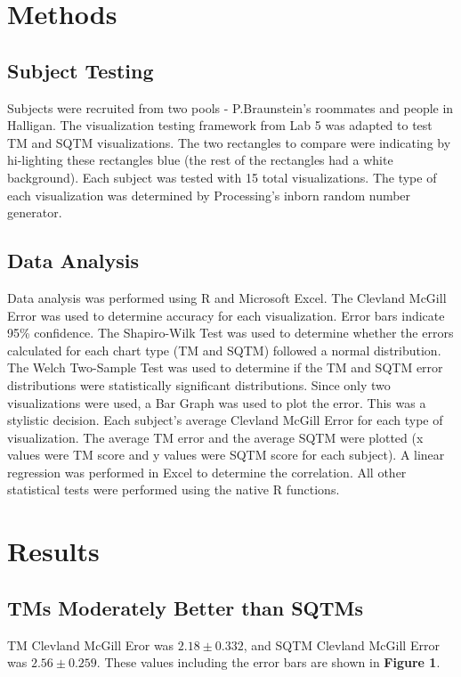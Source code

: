 \documentclass{article}
\begin{document}
\section*{Methods}
\subsection*{Subject Testing}
Subjects were recruited from two pools - P.Braunstein's roommates and people in Halligan. The visualization testing
framework from Lab 5 was adapted to test TM and SQTM visualizations. The two rectangles to compare were indicating
by hi-lighting these rectangles blue (the rest of the rectangles had a white background). Each subject was tested with 15 total visualizations. The type of each visualization was determined by Processing's inborn random number generator.  

\subsection*{Data Analysis}
Data analysis was performed using R and Microsoft Excel. The Clevland McGill Error was used to determine accuracy for each visualization. Error bars indicate 95\% confidence. The Shapiro-Wilk Test was used to determine whether the errors calculated for each chart type (TM and SQTM)
followed a normal distribution. The Welch Two-Sample Test was used to determine if the TM and SQTM error distributions
were statistically significant distributions. Since only two visualizations were used, a Bar Graph was used to plot the error. This was a stylistic decision. Each subject's average Clevland McGill Error for each type of visualization. The average TM error and the average SQTM were plotted (x values were TM score and y values were SQTM score for each subject). A linear regression was performed in Excel to determine the correlation. All other statistical tests were performed using the native R functions.

\section*{Results}
\subsection*{TMs Moderately Better than SQTMs}
TM Clevland McGill Eror was $2.18 \pm 0.332$, and SQTM Clevland McGill Error was $2.56 \pm 0.259$. These values including
the error bars are shown in \textbf{Figure 1}.
\end{document}

